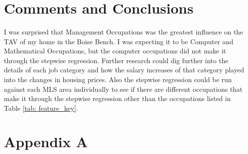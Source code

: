 \documentclass{article}
\begin{document}
\section{Comments and Conclusions}
\paragraph{}I was surprised that Management Occupations was the greatest influence on the TAV of my home in the Boise Bench. I was expecting it to be Computer and Mathematical Occupations, but the computer occupations did not make it through the stepwise regression. Further research could dig further into the details of each job category and how the salary increases of that category played into the changes in housing prices. Also the stepwise regression could be run against each MLS area individually to see if there are different occupations that make it through the stepwise regression other than the occupations listed in Table \ref{tab: feature_key}.


\newpage

\section*{Appendix A}\label{appendixA}
\end{document}
